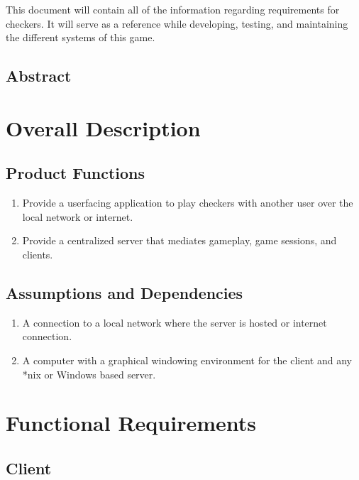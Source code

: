 \documentclass{scrreprt}
\begin{document}
This document will contain all of the information regarding requirements for checkers.
It will serve as a reference while developing, testing, and maintaining the different systems of this game.

\section{Abstract}

\chapter{Overall Description}

\section{Product Functions}

\begin{enumerate}
    \item Provide a userfacing application to play checkers with another user over the local network or internet.
    \item Provide a centralized server that mediates gameplay, game sessions, and clients.
\end{enumerate}

\section{Assumptions and Dependencies}

\begin{enumerate}
    \item A connection to a local network where the server is hosted or internet connection.
    \item A computer with a graphical windowing environment for the client and any *nix or Windows based server.
\end{enumerate}

\chapter{Functional Requirements}

\section{Client}
\end{document}
